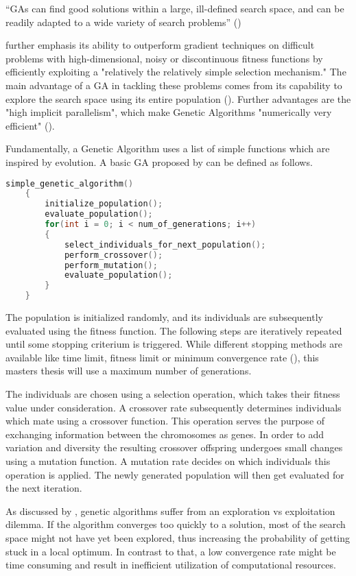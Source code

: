 \enquote{GAs can find good solutions within a large, ill-defined search space, and can be readily adapted to a wide variety of search problems} (\cite{mills_determining_2015})

\cite{grefenstette_optimization_1986} further emphasis its ability to outperform gradient techniques on difficult problems with high-dimensional, noisy or discontinuous fitness functions by efficiently exploiting a "relatively the relatively simple selection mechanism." The main advantage of a GA in tackling these problems comes from its capability to explore the search space using its entire population (\cite{hussain_trade-off_2020}). Further advantages are the "high implicit parallelism", which make Genetic Algorithms "numerically very efficient" (\cite{marsili_libelli_adaptive_2000}).

Fundamentally, a Genetic Algorithm uses a list of simple functions which are inspired by evolution. A basic GA proposed by  can be defined as follows.

\begin{lstlisting}[language=C, tabsize=4]
	simple_genetic_algorithm() 
	{
		initialize_population();
		evaluate_population();
		for(int i = 0; i < num_of_generations; i++) 
		{
			select_individuals_for_next_population();
			perform_crossover();
			perform_mutation();
			evaluate_population();
		}
	}
\end{lstlisting}

The population is initialized randomly, and its individuals are subsequently evaluated using the fitness function. The following steps are iteratively repeated until some stopping criterium is triggered. While different stopping methods are available like time limit, fitness limit or minimum convergence rate (\cite{majumdar_genetic_2015}), this masters thesis will use a maximum number of generations.

The individuals are chosen using a selection operation, which takes their fitness value under consideration. A crossover rate subsequently determines individuals which mate using a crossover function. This operation serves the purpose of exchanging information between the chromosomes as genes. In order to add variation and diversity the resulting crossover offspring undergoes small changes using a mutation function. A mutation rate decides on which individuals this operation is applied. The newly generated population will then get evaluated for the next iteration.

As discussed by \cite{hussain_trade-off_2020}, genetic algorithms suffer from an exploration vs exploitation dilemma. If the algorithm converges too quickly to a solution, most of the search space might not have yet been explored, thus increasing the probability of getting stuck in a local optimum.
In contrast to that, a low convergence rate might be time consuming and result in inefficient utilization of computational resources.

